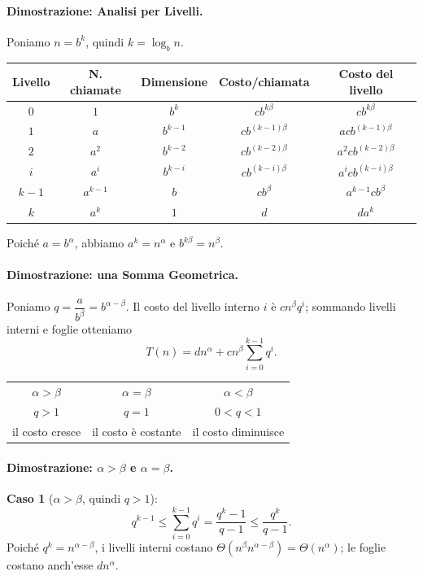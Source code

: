 \documentclass[12pt, a4paper]{article}
\begin{document}
\paragraph{Dimostrazione: Analisi per Livelli.}
Poniamo $n=b^k$, quindi $k=\log_b n$.
\begin{center}
\small
\begin{tabular}{ccccc}
\toprule
\textbf{Livello} & \textbf{N. chiamate} & \textbf{Dimensione} & \textbf{Costo/chiamata} & \textbf{Costo del livello} \\
\midrule
$0$ & $1$ & $b^k$ & $cb^{k\beta}$ & $cb^{k\beta}$ \\
$1$ & $a$ & $b^{k-1}$ & $cb^{(k-1)\beta}$ & $acb^{(k-1)\beta}$ \\
$2$ & $a^2$ & $b^{k-2}$ & $cb^{(k-2)\beta}$ & $a^2cb^{(k-2)\beta}$ \\
$i$ & $a^i$ & $b^{k-i}$ & $cb^{(k-i)\beta}$ & $a^icb^{(k-i)\beta}$ \\
$k-1$ & $a^{k-1}$ & $b$ & $cb^\beta$ & $a^{k-1}cb^\beta$ \\
$k$ & $a^k$ & $1$ & $d$ & $da^k$ \\
\bottomrule
\end{tabular}
\end{center}
Poiché $a=b^\alpha$, abbiamo $a^k=n^\alpha$ e $b^{k\beta}=n^\beta$.

\paragraph{Dimostrazione: una Somma Geometrica.}
Poniamo $q = \dfrac{a}{b^\beta} = b^{\alpha-\beta}$. Il costo del livello interno $i$ è $cn^\beta q^i$; sommando livelli interni e foglie otteniamo
$$T(n) = dn^\alpha + cn^\beta\sum_{i=0}^{k-1}q^i.$$

\begin{center}
\begin{tabular}{ccc}
\toprule
$\alpha>\beta$ & $\alpha=\beta$ & $\alpha<\beta$ \\
$q>1$ & $q=1$ & $0<q<1$ \\
\midrule
il costo cresce & il costo è costante & il costo diminuisce \\
\bottomrule
\end{tabular}
\end{center}

\paragraph{Dimostrazione: $\alpha>\beta$ e $\alpha=\beta$.}
\textbf{Caso 1} ($\alpha>\beta$, quindi $q>1$):
$$q^{k-1} \le \sum_{i=0}^{k-1}q^i = \frac{q^k-1}{q-1} \le \frac{q^k}{q-1}.$$
Poiché $q^k=n^{\alpha-\beta}$, i livelli interni costano $\Theta(n^\beta n^{\alpha-\beta})=\Theta(n^\alpha)$; le foglie costano anch'esse $dn^\alpha$.
\end{document}

